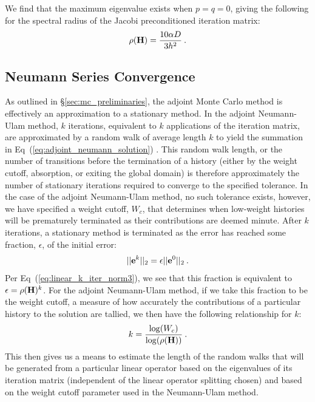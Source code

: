 We find that the maximum eigenvalue exists when $p=q=0$, giving the
following for the spectral radius of the Jacobi preconditioned
iteration matrix:
\begin{equation}
  \rho(\mathbf{H}) = \frac{10 \alpha D}{3 h^2}\:.
  \label{eq:iteration_radius}
\end{equation}

\subsection{Neumann Series Convergence}
\label{subsec:neumann_convergence}
As outlined in \S\ref{sec:mc_preliminaries}, the adjoint Monte Carlo
method is effectively an approximation to a stationary method. In the
adjoint Neumann-Ulam method, $k$ iterations, equivalent to $k$
applications of the iteration matrix, are approximated by a random
walk of average length $k$ to yield the summation in
Eq~(\ref{eq:adjoint_neumann_solution})
\citep{dimov_new_1998,danilov_asymptotic_2000}. This random walk
length, or the number of transitions before the termination of a
history (either by the weight cutoff, absorption, or exiting the
global domain) is therefore approximately the number of stationary
iterations required to converge to the specified tolerance. In the
case of the adjoint Neumann-Ulam method, no such tolerance exists,
however, we have specified a weight cutoff, $W_c$, that determines
when low-weight histories will be prematurely terminated as their
contributions are deemed minute. After $k$ iterations, a stationary
method is terminated as the error has reached some fraction,
$\epsilon$, of the initial error:
\begin{equation}
  ||\mathbf{e}^{k}||_2 = \epsilon ||\mathbf{e}^0||_2\:.
  \label{eq:linear_k_iter_norm4}
\end{equation}
Per Eq~(\ref{eq:linear_k_iter_norm3}), we see that this fraction is
equivalent to $\epsilon = \rho(\mathbf{H})^k$. For the adjoint
Neumann-Ulam method, if we take this fraction to be the weight cutoff,
a measure of how accurately the contributions of a particular history
to the solution are tallied, we then have the following relationship
for $k$:
\begin{equation}
  k = \frac{ \log(W_c) }{ \log( \rho(\mathbf{H}) ) }\:.
  \label{eq:analytic_k}
\end{equation}
This then gives us a means to estimate the length of the random walks
that will be generated from a particular linear operator based on the
eigenvalues of its iteration matrix (independent of the linear
operator splitting chosen) and based on the weight cutoff parameter
used in the Neumann-Ulam method.

